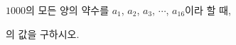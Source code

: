 $1000$의 모든 양의 약수를 $a_1$, $a_2$, $a_3$, $\cdots$, $a_{16}$이라 할 때, \par\smallskip{}\par\smallskip\noindent 의 값을 구하시오.
